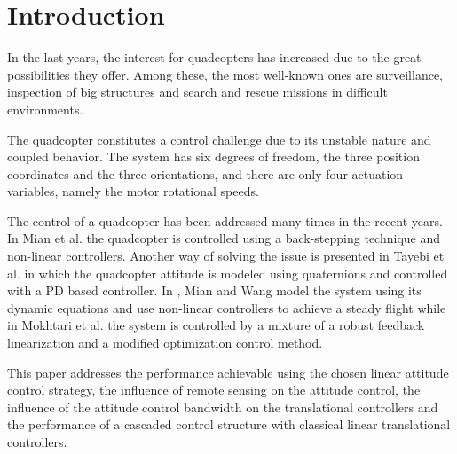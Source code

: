 \section{Introduction}
In the last years, the interest for quadcopters has increased due to the great possibilities they offer. Among these, the most well-known ones are surveillance, inspection of big structures and search and rescue missions in difficult environments. \cite{droneuses}

The quadcopter constitutes a control challenge due to its unstable nature and coupled behavior. The system has six degrees of freedom, the three position coordinates and the three orientations, and there are only four actuation variables, namely the motor rotational speeds. \cite{draganflyer}%

The control of a quadcopter has been addressed many times in the recent years. In Mian et al. \cite{backstepping} the quadcopter is controlled using a back-stepping technique and non-linear controllers. Another way of solving the issue is presented in Tayebi et al. \cite{quaternionsPD} in which the quadcopter attitude is modeled using quaternions and controlled with a PD based controller. In \cite{MianWang}, Mian and Wang model the system using its dynamic equations and use non-linear controllers to achieve a steady flight while in Mokhtari et al. \cite{GHinf} the system is controlled by a mixture of a robust feedback linearization and a modified optimization control method.

This paper addresses the performance achievable using the chosen linear attitude control strategy, the influence of remote sensing on the attitude control, the influence of the attitude control bandwidth on the translational controllers and the performance of a cascaded control structure with classical linear translational controllers.
%

